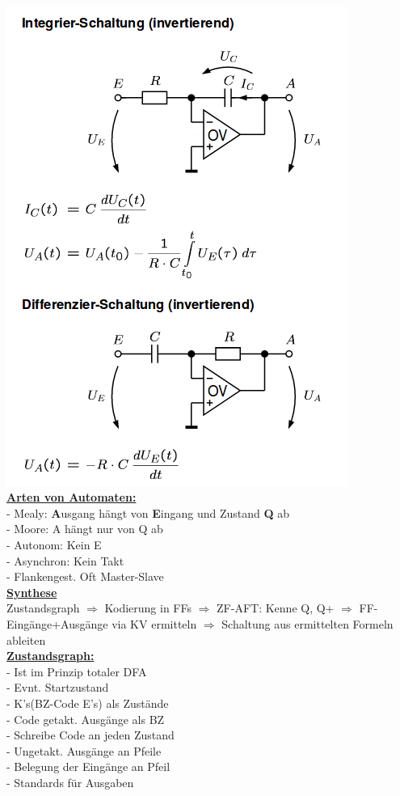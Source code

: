 \documentclass[8pt]{extarticle}
\begin{document}
~~~~~~~
\begin{minipage}{0.33\textwidth}

\includegraphics[scale=0.3]{opv2.png} \\
\underline{\textbf{Arten von Automaten:}}\\
- Mealy: \textbf{A}usgang hängt von \textbf{E}ingang und Zustand \textbf{Q} ab \\
- Moore: A hängt nur von Q ab \\
- Autonom: Kein E \\
- Asynchron: Kein Takt \\
- Flankengest. Oft Master-Slave \\

\underline{\textbf{Synthese}}\\
Zustandsgraph $\Rightarrow$ Kodierung in FFs $\Rightarrow$ ZF-AFT: Kenne Q, Q+ $\Rightarrow$ FF-Eingänge+Ausgänge via KV ermitteln $\Rightarrow$ Schaltung aus ermittelten Formeln ableiten\\

\underline{\textbf{Zustandsgraph:}}\\
- Ist im Prinzip totaler DFA\\
- Evnt. Startzustand\\
- K's(BZ-Code E's) als Zustände\\
- Code getakt. Ausgänge als BZ\\
- Schreibe Code an jeden Zustand\\
- Ungetakt. Ausgänge an Pfeile\\
- Belegung der Eingänge an Pfeil\\
- Standards für Ausgaben \\


\end{minipage}
\end{document}

